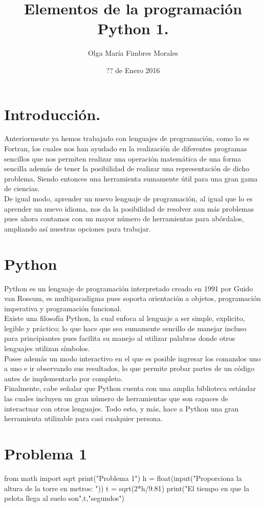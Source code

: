 \documentclass[12pt]{article}
\title{Elementos de la programación Python 1.}
\author{\textcolor{JungleGreen}{Olga María Fimbres Morales}}
\date{?? de Enero 2016}
\begin{document}
\maketitle
\pagebreak
\section*{Introducción.}
Anteriormente ya hemos trabajado con lenguajes de programación, como lo es Fortran, los cuales nos han ayudado en la realización de diferentes programas sencillos que nos permiten realizar una operación matemática de una forma sencilla además de tener la posibilidad de realizar una representación de dicho problema. Siendo entonces una herramienta sumamente útil para una gran gama de ciencias.\\
De igual modo, aprender un nuevo lenguaje de programación, al igual que lo es aprender un nuevo idioma, nos da la posibilidad de resolver aun más problemas pues ahora contamos con un mayor número de herramientas para abórdalos, ampliando así nuestras opciones para trabajar.

\section*{Python}
Python es un lenguaje de programación interpretado creado en 1991 por Guido van Rossum, es multiparadigma pues soporta orientación a objetos, programación imperativa y programación funcional.\\
Existe una filosofía Python, la cual enfoca al lenguaje a ser simple, explicito, legible y práctico; lo que hace que sea sumamente sencillo de manejar incluso para principiantes pues facilita su manejo al utilizar palabras donde otros lenguajes utilizan símbolos.\\
Posee además un modo interactivo en el que es posible ingresar los comandos uno a uno e ir observando sus resultados, lo que permite probar partes de un código antes de implementarlo por completo.\\
Finalmente, cabe señalar que Python cuenta con una amplia biblioteca estándar las cuales incluyen un gran número de herramientas que son capaces de interactuar con otros lenguajes. Todo esto, y más, hace a Python una gran herramienta utilizable para casi cualquier persona.
\pagebreak
\section*{Problema 1}
 from math import sqrt
 print("Problema 1")
 h = float(input("Proporciona la altura de la torre en metros: "))
 t = sqrt(2*h/9.81)
 print("El tiempo en que la pelota llega al suelo son",t,"segundos")
\end{document}
